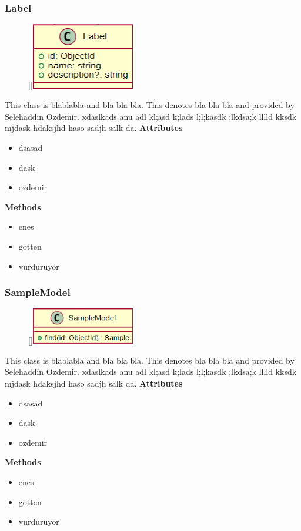 \subsubsection{Label}
\begin{figure}
    \raisebox{0pt}[\dimexpr{}\baselineskip\relax]{\includegraphics[width=4.5cm]{classes/workspace-management/5.png}}
\end{figure} 
\par
This class is blablabla and bla bla bla. This denotes bla bla bla and provided by Selehaddin Ozdemir. xdaslkads anu adl kl;asd k;lads l;l;kasdk ;lkdsa;k lllld kksdk mjdask hdaksjhd haso sadjh salk da.
\newline
\newline
\textbf{Attributes}
\begin{itemize}
    \item dsasad
    \item dask
    \item ozdemir
\end{itemize}
\textbf{Methods}
\begin{itemize}
    \item enes
    \item gotten
    \item vurduruyor
\end{itemize}

\subsubsection{SampleModel}
\begin{figure}
    \raisebox{0pt}[\dimexpr{}\baselineskip\relax]{\includegraphics[width=4.5cm]{classes/workspace-management/6.png}}
\end{figure} 
\par
This class is blablabla and bla bla bla. This denotes bla bla bla and provided by Selehaddin Ozdemir. xdaslkads anu adl kl;asd k;lads l;l;kasdk ;lkdsa;k lllld kksdk mjdask hdaksjhd haso sadjh salk da.
\newline
\newline
\textbf{Attributes}
\begin{itemize}
    \item dsasad
    \item dask
    \item ozdemir
\end{itemize}
\textbf{Methods}
\begin{itemize}
    \item enes
    \item gotten
    \item vurduruyor
\end{itemize}

